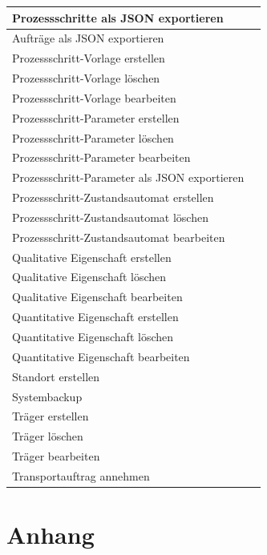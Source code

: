 \documentclass[enabledeprecatedfontcommands,fontsize=12pt,paper=a4,twoside]{scrartcl}
\begin{document}
\begin{longtable}[c]{|p{12cm}|p{3cm}|}
Prozessschritte als JSON exportieren  & \\ \hline
Aufträge als JSON exportieren & \\ \hline
Prozessschritt-Vorlage erstellen & \\ \hline
Prozessschritt-Vorlage löschen & \\ \hline
Prozessschritt-Vorlage bearbeiten & \\ \hline
Prozessschritt-Parameter erstellen & \\ \hline
Prozessschritt-Parameter löschen & \\ \hline
Prozessschritt-Parameter bearbeiten& \\ \hline
Prozessschritt-Parameter als JSON exportieren & \\ \hline
Prozessschritt-Zustandsautomat erstellen & \\ \hline
Prozessschritt-Zustandsautomat löschen & \\ \hline
Prozessschritt-Zustandsautomat bearbeiten & \\ \hline
Qualitative Eigenschaft erstellen & \\ \hline
Qualitative Eigenschaft löschen & \\ \hline
Qualitative Eigenschaft bearbeiten & \\ \hline
Quantitative Eigenschaft erstellen & \\ \hline
Quantitative Eigenschaft löschen & \\ \hline
Quantitative Eigenschaft bearbeiten & \\ \hline
Standort erstellen & \\ \hline
Systembackup & \\ \hline
Träger erstellen & \\ \hline
Träger löschen  & \\ \hline
Träger bearbeiten & \\ \hline
Transportauftrag annehmen  & \\ \hline

\end{longtable}


\newpage
\section{Anhang}
\end{document}

